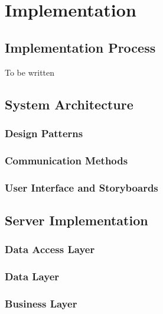 
\chapter{Implementation} %

\label{Chapter5} %



\section{Implementation Process}

To be written

\section{System Architecture}
\subsection{Design Patterns}
\subsection{Communication Methods}
\subsection{User Interface and Storyboards}

\section{Server Implementation}
\subsection{Data Access Layer}
\subsection{Data Layer}
\subsection{Business Layer}
